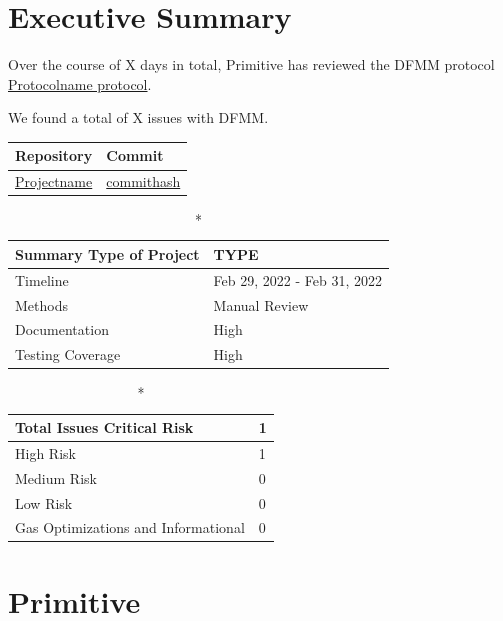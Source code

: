 \documentclass[14pt]{extarticle}
\begin{document}
\section{Executive Summary}\label{executive-summary}

Over the course of X days in total, Primitive has reviewed the DFMM protocol
\href{https://github.com/permalink-to-protocolname}{Protocolname protocol}. 

We found a total of X issues with DFMM. 

\begin{longtable}[c]{|l|l|}
\hline \textbf{Repository} & \textbf{Commit} \\

\hline
\href{https://github.com/permalink}{Projectname} &
\href{https://github.com/permalink/commit/commithash}{commithash} \\
\hline
\end{longtable}

\begin{longtable}[]{|l|l|}

\caption*{\textbf{Summary}}
\hline Type of Project & TYPE \\   
\hline Timeline & Feb 29, 2022 - Feb 31, 2022   \\
\hline Methods & Manual Review \\
\hline Documentation & High \\
\hline Testing Coverage & High  \\
\hline
\end{longtable}


\begin{longtable}[]{|l|l|}
\caption*{\textbf{Total Issues}}
\hline Critical Risk & 1 \\
\hline High Risk & 1 \\
\hline Medium Risk & 0 \\ 
\hline Low Risk & 0 \\
\hline Gas Optimizations and Informational & 0 \\
\hline
\end{longtable}

\tableofcontents

\section{Primitive}\label{primitive}
\end{document}
